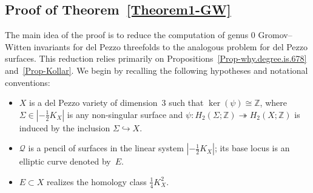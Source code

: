 \documentclass[11pt]{amsart}
\numberwithin{equation}{section}
\theoremstyle{definition}
\theoremstyle{plain}
\theoremstyle{remark}
\newcommand{\Z}{\mathbb{Z}}
\begin{document}
\subsection{Proof of Theorem~\ref{Theorem1-GW}}\label{Sect-Proof.GW}
The main idea of the proof is to reduce the computation of genus $0$ Gromov--Witten invariants for del Pezzo threefolds to the analogous problem for del Pezzo surfaces. This reduction relies primarily on Propositions~\ref{Prop-why.degree.is.678} and~\ref{Prop-Kollar}. We begin by recalling the following hypotheses and notational conventions:
\begin{itemize}
    \item $X$ is a del Pezzo variety of dimension~$3$  such that $\ker(\psi) \cong \Z$, where $\Sigma\in |-\frac{1}{2}K_X|$ is any non-singular surface and $\psi\colon H_2(\Sigma;\Z)\twoheadrightarrow H_2(X;\Z)$ is induced by the inclusion $\Sigma\hookrightarrow X$.
    \item $\mathcal{Q}$ is a pencil of surfaces  in the linear system $|-\frac{1}{2}K_X|$; its base locus is an elliptic curve denoted by~$E$.
    \item $E\subset X$ realizes the homology class $\frac{1}{4}K^2_X$.
\end{itemize}
\end{document}
